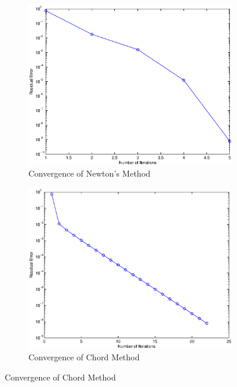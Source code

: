 \documentclass[paper=a4, fontsize=11pt]{scrartcl} %
\numberwithin{equation}{section} %
\numberwithin{figure}{section} %
\numberwithin{table}{section} %
\begin{document}
\begin{figure}[H]
\begin{subfigure}{.5\textwidth}
\centering
\includegraphics [width = 1\linewidth] {newtonfig.eps}
\caption{Convergence of Newton's Method}
\end{subfigure}
\begin{subfigure}{.5\textwidth}
\centering
\includegraphics [width = 1\linewidth] {chordfig.eps}
\caption{Convergence of Chord Method}
\end{subfigure}
\end{figure}
\end{document}
